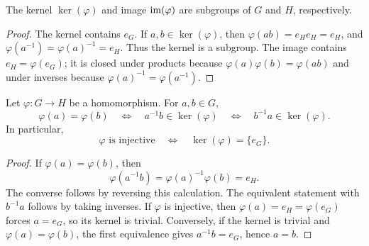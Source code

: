 \documentclass[reqno,11pt]{amsart}
\begin{document}
\begin{proposition}
	The kernel $\ker(\varphi)$ and image $\operatorname{im}(\varphi)$ are subgroups of
	$G$ and $H$, respectively.
\end{proposition}
\begin{proof}
	The kernel contains $e_G$. If $a,b\in\ker(\varphi)$, then
	$\varphi(ab)=e_He_H=e_H$, and
	$\varphi(a^{-1})=\varphi(a)^{-1}=e_H$. Thus the kernel is a subgroup.
	The image contains $e_H=\varphi(e_G)$; it is closed under products because
	$\varphi(a)\varphi(b)=\varphi(ab)$ and under inverses because
	$\varphi(a)^{-1}=\varphi(a^{-1})$.
\end{proof}

\begin{lemma}
	Let $\varphi:G\to H$ be a homomorphism. For $a,b\in G$,
	\begin{equation}
		\varphi(a)=\varphi(b)
		\quad\Longleftrightarrow\quad
		a^{-1}b\in\ker(\varphi)
		\quad\Longleftrightarrow\quad
		b^{-1}a\in\ker(\varphi).
	\end{equation}
	In particular,
	\begin{equation}
		\varphi\text{ is injective}
		\quad\Longleftrightarrow\quad
		\ker(\varphi)=\{e_G\}.
	\end{equation}
\end{lemma}

\begin{proof}
	If $\varphi(a)=\varphi(b)$, then
	\[
	\varphi(a^{-1}b)=\varphi(a)^{-1}\varphi(b)=e_H.
	\]
	The converse follows by reversing this calculation. The equivalent statement
	with $b^{-1}a$ follows by taking inverses. If $\varphi$ is injective,
	then $\varphi(a)=e_H=\varphi(e_G)$ forces $a=e_G$, so its kernel is
	trivial. Conversely, if the kernel is trivial and $\varphi(a)=\varphi(b)$,
	the first equivalence gives $a^{-1}b=e_G$, hence $a=b$.
\end{proof}
%
\end{document}

